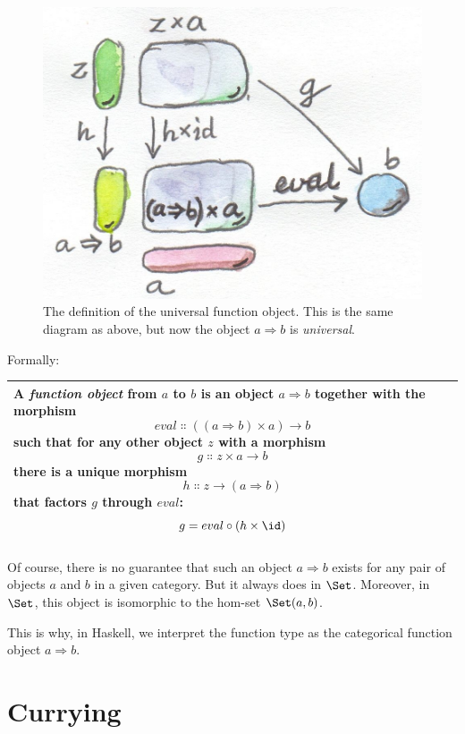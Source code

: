 \begin{figure}[H]
\centering
\includegraphics{images/universalfunctionobject.jpg}
\caption{The definition of the universal function object. This is the same
diagram as above, but now the object $a \Rightarrow b$ is \emph{universal}.}
\end{figure}

\noindent
Formally:

\begin{longtable}[]{@{}l@{}}
\toprule
\begin{minipage}[t]{0.97\columnwidth}\raggedright\strut
A \emph{function object} from $a$ to $b$ is an object
$a \Rightarrow b$ together with the morphism
\[eval \Colon ((a \Rightarrow b) \times a) \to b\]
such that for any other object $z$ with a morphism
\[g \Colon z \times a \to b\]
there is a unique morphism
\[h \Colon z \to (a \Rightarrow b)\]
that factors $g$ through $eval$:
\[g = eval \circ (h \times \id)\]
\end{minipage}\tabularnewline
\bottomrule
\end{longtable}

\noindent
Of course, there is no guarantee that such an object $a \Rightarrow b$ exists
for any pair of objects $a$ and $b$ in a given category.
But it always does in $\Set$. Moreover, in $\Set$, this
object is isomorphic to the hom-set $\Set(a, b)$.

This is why, in Haskell, we interpret the function type
 as the categorical function object $a \Rightarrow b$.

\section{Currying}

